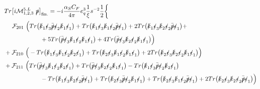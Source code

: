 \documentclass[aps,prd,superscriptaddress,floatfix,showpacs]{revtex4}
\begin{document}
\begin{equation}\label{eq-finite-5L}
\begin{aligned}
&Tr\big[ i\mathcal{M}^{5.L}_{1,2,3} ~\slashed{p} \big]_{\mathrm{fin.}} =-i\frac{\alpha_S C_F}{4\pi} e_q^3  \frac{1}{\xi}s^{-2}\frac{1}{2} \bigg\{ \\
&\phantom{Aa}\mathcal{F}_{201}~\Big( Tr\big( \slashed{k}_1 \slashed{\epsilon}_3 \bar{\slashed{p}} \slashed{\epsilon}_2 \slashed{k}_1 \slashed{\epsilon}_1  \big) + Tr\big( \slashed{k}_1 \slashed{\epsilon}_3 \slashed{k}_1 \slashed{\epsilon}_2  \bar{\slashed{p}} \slashed{\epsilon}_1  \big) 
	+ 2 Tr\big( \slashed{k}_1 \slashed{\epsilon}_3 \slashed{k}_2 \slashed{\epsilon}_2  \bar{\slashed{p}} \slashed{\epsilon}_1  \big)  + \\
& \phantom{AAAAAAAA}+ 5 Tr\big( \bar{\slashed{p}} \slashed{\epsilon}_3 \slashed{k}_1 \slashed{\epsilon}_2 \slashed{k}_1 \slashed{\epsilon}_1 \big) + 4 Tr\big( \bar{\slashed{p}} \slashed{\epsilon}_3 \slashed{k}_2 \slashed{\epsilon}_2 \slashed{k}_1 \slashed{\epsilon}_1 \big) \Big)  \\
&+\mathcal{F}_{210}~\Big( -Tr\big( \slashed{k}_1 \slashed{\epsilon}_3 \slashed{k}_1 \slashed{\epsilon}_2  \slashed{k}_2 \slashed{\epsilon}_1  \big) +Tr\big( \slashed{k}_2 \slashed{\epsilon}_3 \slashed{k}_1 \slashed{\epsilon}_2 \slashed{k}_1 \slashed{\epsilon}_1  \big) 
	+2Tr\big( \slashed{k}_2 \slashed{\epsilon}_3 \slashed{k}_2 \slashed{\epsilon}_2 \slashed{k}_1 \slashed{\epsilon}_1  \big) \Big)  \\
&+ \mathcal{F}_{211}~ \Big( Tr\big( \bar{\slashed{p}} \slashed{\epsilon}_3 \slashed{k}_1 \slashed{\epsilon}_2 \slashed{k}_2 \slashed{\epsilon}_1  \big) + Tr\big( \bar{\slashed{p}} \slashed{\epsilon}_3 \slashed{k}_2 \slashed{\epsilon}_2 \slashed{k}_1 \slashed{\epsilon}_1  \big) - Tr\big( \slashed{k}_1 \slashed{\epsilon}_3 \bar{\slashed{p}} \slashed{\epsilon}_2 \slashed{k}_2 \slashed{\epsilon}_1  \big)   \\
&\phantom{AAAAAAAA} - Tr\big( \slashed{k}_1 \slashed{\epsilon}_3 \slashed{k}_2 \slashed{\epsilon}_2  \bar{\slashed{p}} \slashed{\epsilon}_1  \big) + Tr\big( \slashed{k}_2 \slashed{\epsilon}_3 \bar{\slashed{p}} \slashed{\epsilon}_2 \slashed{k}_1 \slashed{\epsilon}_1  \big) +
 Tr\big( \slashed{k}_2 \slashed{\epsilon}_3 \slashed{k}_1 \slashed{\epsilon}_2 \bar{\slashed{p}} \slashed{\epsilon}_1  \big) + 2 Tr\big( \slashed{k}_2 \slashed{\epsilon}_3 \slashed{k}_2 \slashed{\epsilon}_2 \bar{\slashed{p}} \slashed{\epsilon}_1  \big) \Big)  \\

\end{aligned}
\end{equation}
\end{document}
